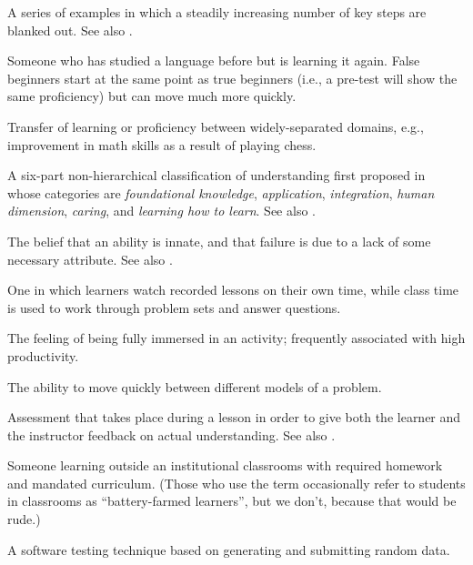 \begin{description}
 A series of examples in which a steadily
increasing number of key steps are blanked out. See
also .

 Someone who has studied a language
before but is learning it again. False beginners start at the same point as true
beginners (i.e., a pre-test will show the same proficiency) but can move much
more quickly.

 Transfer of learning or proficiency
between widely-separated domains, e.g., improvement in math skills as a result
of playing chess.

 A six-part non-hierarchical
classification of understanding first proposed in~\cite{Fink2013} whose
categories are \emph{foundational knowledge}, \emph{application},
\emph{integration}, \emph{human dimension}, \emph{caring}, and \emph{learning
  how to learn}. See also .

 The belief that an ability is innate,
and that failure is due to a lack of some necessary attribute. See also
.

 One in which learners watch
recorded lessons on their own time, while class time is used to work through
problem sets and answer questions.

 The feeling of being fully immersed in an activity;
frequently associated with high productivity.

 The ability to move
quickly between different models of a problem.

 Assessment that takes
place during a lesson in order to give both the learner and the instructor
feedback on actual understanding. See
also .

 Someone learning outside an
institutional classrooms with required homework and mandated curriculum. (Those
who use the term occasionally refer to students in classrooms as
``battery-farmed learners'', but we don't, because that would be rude.)

 A software testing technique based on
generating and submitting random data.


\end{description}
